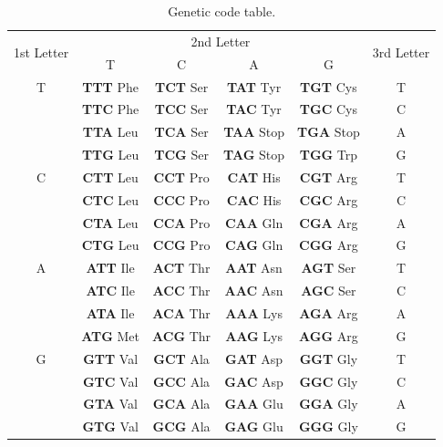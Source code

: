 \begin{table}[h!]
    \centering
    \small
    \begin{tabular}{|c|c|c|c|c|c|}
    \hline
    \multirow{2}{*}{1st Letter} & \multicolumn{4}{c|}{2nd Letter} & \multirow{2}{*}{3rd Letter} \\ \cline{2-5}
     & T & C & A & G &  \\ \hline
    T & \textbf{TTT} Phe & \textbf{TCT} Ser & \textbf{TAT} Tyr & \textbf{TGT} Cys & T \\
      & \textbf{TTC} Phe & \textbf{TCC} Ser & \textbf{TAC} Tyr & \textbf{TGC} Cys & C \\
      & \textbf{TTA} Leu & \textbf{TCA} Ser & \textbf{TAA} Stop & \textbf{TGA} Stop & A \\
      & \textbf{TTG} Leu & \textbf{TCG} Ser & \textbf{TAG} Stop & \textbf{TGG} Trp & G \\ \hline
    C & \textbf{CTT} Leu & \textbf{CCT} Pro & \textbf{CAT} His & \textbf{CGT} Arg & T \\
      & \textbf{CTC} Leu & \textbf{CCC} Pro & \textbf{CAC} His & \textbf{CGC} Arg & C \\
      & \textbf{CTA} Leu & \textbf{CCA} Pro & \textbf{CAA} Gln & \textbf{CGA} Arg & A \\
      & \textbf{CTG} Leu & \textbf{CCG} Pro & \textbf{CAG} Gln & \textbf{CGG} Arg & G \\ \hline
    A & \textbf{ATT} Ile & \textbf{ACT} Thr & \textbf{AAT} Asn & \textbf{AGT} Ser & T \\
      & \textbf{ATC} Ile & \textbf{ACC} Thr & \textbf{AAC} Asn & \textbf{AGC} Ser & C \\
      & \textbf{ATA} Ile & \textbf{ACA} Thr & \textbf{AAA} Lys & \textbf{AGA} Arg & A \\
      & \textbf{ATG} Met & \textbf{ACG} Thr & \textbf{AAG} Lys & \textbf{AGG} Arg & G \\ \hline
    G & \textbf{GTT} Val & \textbf{GCT} Ala & \textbf{GAT} Asp & \textbf{GGT} Gly & T \\
      & \textbf{GTC} Val & \textbf{GCC} Ala & \textbf{GAC} Asp & \textbf{GGC} Gly & C \\
      & \textbf{GTA} Val & \textbf{GCA} Ala & \textbf{GAA} Glu & \textbf{GGA} Gly & A \\
      & \textbf{GTG} Val & \textbf{GCG} Ala & \textbf{GAG} Glu & \textbf{GGG} Gly & G \\ \hline
    \end{tabular}
    \caption{Genetic code table.}
    \end{table}

